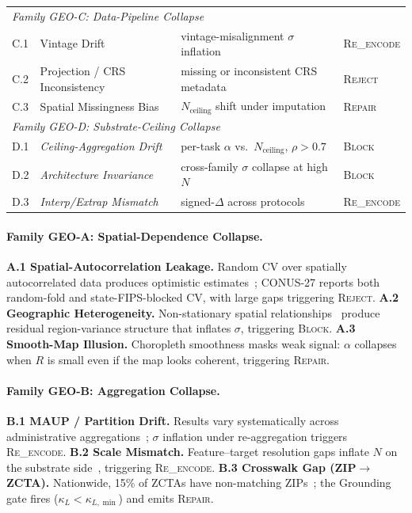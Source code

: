 \documentclass{article}
\begin{document}
\begin{table}[htbp]
\begin{tabular}{llll}
\midrule
\multicolumn{4}{l}{\textit{Family GEO-C: Data-Pipeline Collapse}} \\
C.1 & Vintage Drift                             & vintage-misalignment $\sigma$ inflation                               & \textsc{Re\_encode} \\
C.2 & Projection / CRS Inconsistency            & missing or inconsistent CRS metadata                                  & \textsc{Reject}    \\
C.3 & Spatial Missingness Bias                  & $N_{\text{ceiling}}$ shift under imputation                           & \textsc{Repair}    \\
\midrule
\multicolumn{4}{l}{\textit{Family GEO-D: Substrate-Ceiling Collapse}} \\
D.1 & \textit{Ceiling-Aggregation Drift}        & per-task $\alpha$ vs.\ $N_{\text{ceiling}}$, $\rho > 0.7$            & \textsc{Block}     \\
D.2 & \textit{Architecture Invariance}          & cross-family $\sigma$ collapse at high $N$                            & \textsc{Block}     \\
D.3 & \textit{Interp/Extrap Mismatch}           & signed-$\Delta$ across protocols                                      & \textsc{Re\_encode} \\
\bottomrule
\end{tabular}
\end{table}

\paragraph{Family GEO-A: Spatial-Dependence Collapse.}
\textbf{A.1 Spatial-Autocorrelation Leakage.} Random CV over spatially autocorrelated data produces optimistic estimates~\citep{roberts2017cv,ploton2020spatial,mila2022nndm}; CONUS-27 reports both random-fold and state-FIPS-blocked CV, with large gaps triggering \textsc{Reject}.
\textbf{A.2 Geographic Heterogeneity.} Non-stationary spatial relationships~\citep{brunsdon1996gwr} produce residual region-variance structure that inflates $\sigma$, triggering \textsc{Block}.
\textbf{A.3 Smooth-Map Illusion.} Choropleth smoothness masks weak signal: $\alpha$ collapses when $R$ is small even if the map looks coherent, triggering \textsc{Repair}.

\paragraph{Family GEO-B: Aggregation Collapse.}
\textbf{B.1 MAUP / Partition Drift.} Results vary systematically across administrative aggregations~\citep{openshaw1984maup}; $\sigma$ inflation under re-aggregation triggers \textsc{Re\_encode}.
\textbf{B.2 Scale Mismatch.} Feature--target resolution gaps inflate $N$ on the substrate side~\citep{workman2022resolution}, triggering \textsc{Re\_encode}.
\textbf{B.3 Crosswalk Gap (ZIP$\to$ZCTA).} Nationwide, 15\% of ZCTAs have non-matching ZIPs~\citep{krieger2002zip,chen2025crosswalk}; the Grounding gate fires ($\kappa_L < \kappa_{L,\min}$) and emits \textsc{Repair}.
\end{document}
